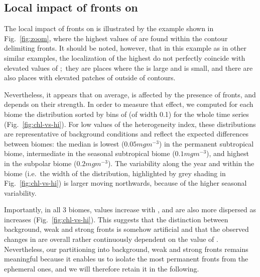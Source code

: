 \subsection{Local impact of fronts on }

The local impact of fronts on  is illustrated by the example shown in Fig.~\ref{fig:zoom}, where the highest values of  are found within the  contour delimiting fronts.
It should be noted, however, that in this example as in other similar examples, the localization of the highest  do not perfectly coincide with elevated values of ;\ they are places where the  is large and  is small, and there are also places with elevated patches of  outside of  contours.

Nevertheless, it appears that on average,  is affected by the presence of fronts, and depends on their strength.
In order to measure that effect, we computed for each biome the  distribution sorted by bins of  (of width 0.1) for the whole time series (Fig.~\ref{fig:chl-vs-hi}).
For low values of the heterogeneity index, these distributions are representative of background conditions and reflect the expected differences between biomes: the median  is lowest (\(0.05 mg m^{-3}\)) in the permanent subtropical biome, intermediate in the seasonal subtropical biome (\(0.1 mg m^{-3}\)), and highest in the subpolar biome (\(0.2 mg m^{-3}\)).
The  variability along the year and within the biome (i.e.\ the width of the distribution, highlighted by grey shading in Fig.~\ref{fig:chl-vs-hi}) is larger moving northwards, because of the higher seasonal variability.

Importantly, in all 3 biomes,  values increase with , and are also more dispersed as  increases (Fig.~\ref{fig:chl-vs-hi}).
This suggests that the distinction between background, weak and strong fronts is somehow artificial and that the observed changes in  are overall rather continuously dependent on the value of .\@
Nevertheless, our partitioning into background, weak and strong fronts remains meaningful because it enables us to isolate the most permanent fronts from the ephemeral ones, and we will therefore retain it in the following.


